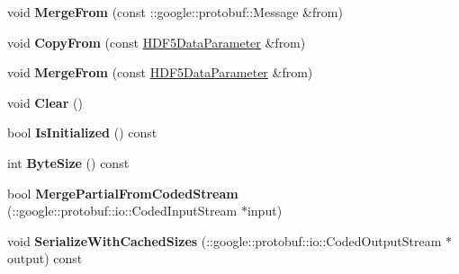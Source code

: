 \begin{DoxyCompactItemize}
\item 
\mbox{\label{classcaffe_1_1_h_d_f5_data_parameter_aaaa75f36b1ac55a429b8b09c4ef3239f}} 
void {\bfseries Merge\+From} (const \+::google\+::protobuf\+::\+Message \&from)
\item 
\mbox{\label{classcaffe_1_1_h_d_f5_data_parameter_ae15d2cc8bc43a767be3347612c98b182}} 
void {\bfseries Copy\+From} (const \mbox{\hyperlink{classcaffe_1_1_h_d_f5_data_parameter}{H\+D\+F5\+Data\+Parameter}} \&from)
\item 
\mbox{\label{classcaffe_1_1_h_d_f5_data_parameter_a953f138e42bdb37b2e4fbb44ef19b4ea}} 
void {\bfseries Merge\+From} (const \mbox{\hyperlink{classcaffe_1_1_h_d_f5_data_parameter}{H\+D\+F5\+Data\+Parameter}} \&from)
\item 
\mbox{\label{classcaffe_1_1_h_d_f5_data_parameter_ac1311b334997ea952ab6fd47d0d2fc92}} 
void {\bfseries Clear} ()
\item 
\mbox{\label{classcaffe_1_1_h_d_f5_data_parameter_a507f8cc32c9a387d2c9282e8950a17fb}} 
bool {\bfseries Is\+Initialized} () const
\item 
\mbox{\label{classcaffe_1_1_h_d_f5_data_parameter_a5e2ac4de453f0d7bfe165feef8f9bb26}} 
int {\bfseries Byte\+Size} () const
\item 
\mbox{\label{classcaffe_1_1_h_d_f5_data_parameter_ad4fa1f44f734b9e2f35e04050d0a75c9}} 
bool {\bfseries Merge\+Partial\+From\+Coded\+Stream} (\+::google\+::protobuf\+::io\+::\+Coded\+Input\+Stream $\ast$input)
\item 
\mbox{\label{classcaffe_1_1_h_d_f5_data_parameter_a906c57675c74cdf9d4198896684a1ba2}} 
void {\bfseries Serialize\+With\+Cached\+Sizes} (\+::google\+::protobuf\+::io\+::\+Coded\+Output\+Stream $\ast$output) const
\item 
\mbox{\label{classcaffe_1_1_h_d_f5_data_parameter_a4732fcd206aa1b48b4f908f265af1e5e}} 

\end{DoxyCompactItemize}
